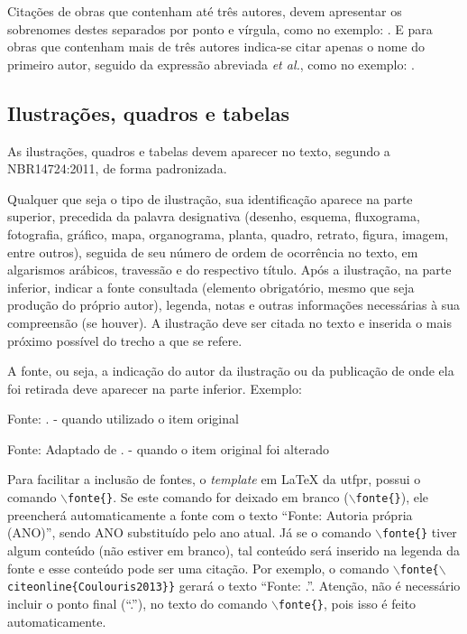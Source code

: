 Citações de obras que contenham até três autores, devem apresentar os sobrenomes destes separados por ponto e vírgula, como no exemplo: \cite[p. 2]{Pinto2000}. E para obras que contenham mais de três autores indica-se citar apenas o nome do primeiro autor, seguido da expressão abreviada \textit{et al.}, como no exemplo: \cite{Guimaraes2003}.

\subsection{Ilustrações, quadros e tabelas}\label{subsec:ilustracoes}

As ilustrações, quadros e tabelas devem aparecer no texto, segundo a NBR14724:2011, de forma padronizada.

Qualquer que seja o tipo de ilustração, sua identificação aparece na parte superior, precedida da palavra designativa (desenho, esquema, fluxograma, fotografia, gráfico, mapa, organograma, planta, quadro, retrato, figura, imagem, entre outros), seguida de seu número de ordem de ocorrência no texto, em algarismos arábicos, travessão e do respectivo título. Após a ilustração, na parte inferior, indicar a fonte consultada (elemento obrigatório, mesmo que seja produção do próprio autor), legenda, notas e outras informações necessárias à sua compreensão (se houver). A ilustração deve ser citada no texto e inserida o mais próximo possível do trecho a que se refere.

A fonte, ou seja, a indicação do autor da ilustração ou da publicação de onde ela foi retirada deve aparecer na parte inferior. Exemplo:

Fonte: . 			- quando utilizado o item original

Fonte: Adaptado de .	- quando o item original foi alterado

Para facilitar a inclusão de fontes, o \textit{template} em LaTeX da \gls{utfpr}, possui o comando \texttt{$\backslash$fonte\{\}}. Se este comando for deixado em branco (\texttt{$\backslash$fonte\{\}}),  ele preencherá automaticamente a fonte com o texto  ``Fonte: Autoria própria (ANO)'', sendo ANO substituído pelo ano atual. Já se o comando \texttt{$\backslash$fonte\{\}} tiver algum conteúdo (não estiver em branco), tal conteúdo será inserido na legenda da fonte e esse conteúdo pode ser uma citação. Por exemplo, o comando \texttt{$\backslash$fonte\{$\backslash$citeonline\{Coulouris2013\}\}} gerará o texto ``Fonte: .''. Atenção, não é necessário incluir o ponto final (``.''), no texto do comando \texttt{$\backslash$fonte\{\}}, pois isso é feito automaticamente.


